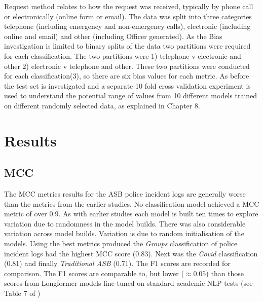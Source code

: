 Request method relates to how the request was received, typically by phone call or electronically (online form or email). The data was split into three categories telephone (including emergency and non-emergency calls), electronic (including online and email) and other (including  Officer generated). As the Bias investigation is limited to binary splits of the data two partitions were required for each classification. The two partitions were 1) telephone v electronic and other 2) electronic v telephone and other. These two partitions were conducted for each classification(3), so there are six bias values for each metric. As before the test set is investigated and a separate 10 fold cross validation experiment is used to understand the potential range of values from 10 different models trained on different randomly selected data, as explained in Chapter 8.

 

\section{Results}

\subsection{MCC} The MCC metrics results for the ASB police incident logs are generally worse than the metrics from the earlier studies. No classification model achieved a MCC metric of over 0.9. As with earlier studies each model is built ten times to explore variation due to randomness in the model builds. There was also considerable variation across model builds. Variation is due to random initialisation of the models. Using the best metrics produced the \emph{Groups} classification of police incident logs had the highest MCC score (0.83). Next was the \emph{Covid} classification (0.81) and finally \emph{Traditional ASB} (0.71). The F1 scores are recorded for comparison. The F1 scores are comparable to, but lower ($\approx 0.05$) than those scores from Longformer models fine-tuned on standard academic NLP tests (see Table 7 of \textcite{beltagy2020longformer}) 

